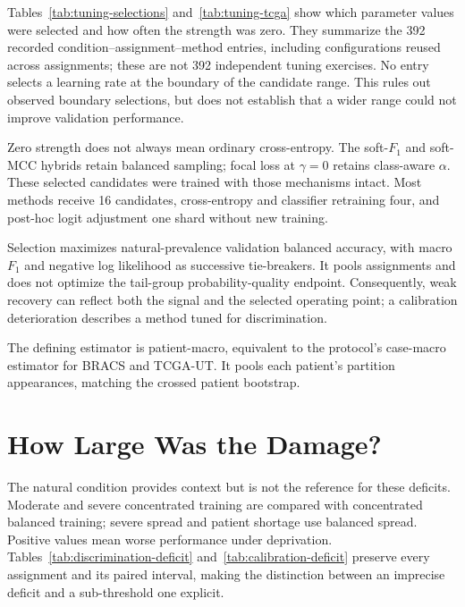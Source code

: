 Tables~\ref{tab:tuning-selections} and~\ref{tab:tuning-tcga} show which parameter values were selected and how often the strength was zero. They summarize the \num{392} recorded condition--assignment--method entries, including configurations reused across assignments; these are not \num{392} independent tuning exercises. No entry selects a learning rate at the boundary of the candidate range. This rules out observed boundary selections, but does not establish that a wider range could not improve validation performance.

\begin{table}[H]
\centering\small

\caption{BRACS tuning summary. Ranges span recorded selections; zero-strength counts use entries with a strength parameter as denominator. Strength has a method-specific meaning and cannot be compared numerically across methods.}
\label{tab:tuning-selections}
\end{table}
\begin{table}[H]
\centering\small

\caption{TCGA-UT tuning summary, using the same conventions as Table~\ref{tab:tuning-selections}. Post-hoc logit adjustment reuses the cross-entropy checkpoint.}
\label{tab:tuning-tcga}
\end{table}

\noindent Zero strength does not always mean ordinary cross-entropy. The soft-$F_1$ and soft-MCC hybrids retain balanced sampling; focal loss at $\gamma=0$ retains class-aware $\alpha$. These selected candidates were trained with those mechanisms intact. Most methods receive \num{16} candidates, cross-entropy and classifier retraining four, and post-hoc logit adjustment one shard without new training.

Selection maximizes natural-prevalence validation balanced accuracy, with macro $F_1$ and negative log likelihood as successive tie-breakers. It pools assignments and does not optimize the tail-group probability-quality endpoint. Consequently, weak recovery can reflect both the signal and the selected operating point; a calibration deterioration describes a method tuned for discrimination.

The defining estimator is patient-macro, equivalent to the protocol's case-macro estimator for BRACS and TCGA-UT. It pools each patient's partition appearances, matching the crossed patient bootstrap.

\clearpage
\section{How Large Was the Damage?}
\label{app:damage-estimates}
The natural condition provides context but is not the reference for these deficits. Moderate and severe concentrated training are compared with concentrated balanced training; severe spread and patient shortage use balanced spread. Positive values mean worse performance under deprivation. Tables~\ref{tab:discrimination-deficit} and~\ref{tab:calibration-deficit} preserve every assignment and its paired interval, making the distinction between an imprecise deficit and a sub-threshold one explicit.

